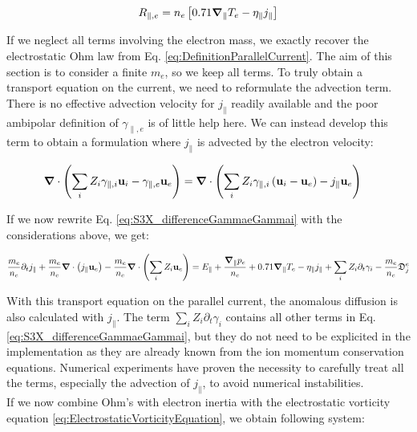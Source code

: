 \begin{align}
	R_{\parallel,e} = n_e\left[0.71\grad_\parallel T_e - \eta_\parallel j_\parallel\right]
\end{align}

If we neglect all terms involving the electron mass, we exactly recover the electrostatic Ohm law from Eq. \ref{eq:DefinitionParallelCurrent}. The aim of this section is to consider a finite $m_e$, so we keep all terms. To truly obtain a transport equation on the current, we need to reformulate the advection term. There is no effective advection velocity for $j_\parallel$ readily available and the poor ambipolar definition of $\gamma_{\parallel,e}$ is of little help here. We can instead develop this term to obtain a formulation where $j_\parallel$ is advected by the electron velocity:

\begin{align}
	\grad\cdot\left(\sum_i Z_i\gamma_{\parallel,i}\mathbf{u}_i - \gamma_{\parallel,e}\mathbf{u}_e\right) &= \grad\cdot\left(\sum_i Z_i\gamma_{\parallel,i}\left(\mathbf{u}_i-\mathbf{u}_e\right) - j_\parallel\mathbf{u}_e\right)
\end{align}

If we now rewrite Eq. \ref{eq:S3X_differenceGammaeGammai} with the considerations above, we get: 

\begin{equation}
	\label{eq:S3X_OhmLawElectronInertia}
	\frac{m_e}{n_e}\partial_t j_\parallel + \frac{m_e}{n_e}\grad\cdot\left(j_\parallel\mathbf{u}_e\right)  - \frac{m_e}{n_e}\grad\cdot\left(\sum_i Z_i\mathbf{u}_e\right) = E_\parallel + \frac{\grad_\parallel p_e}{n_e} + 0.71\grad_\parallel T_e - \eta_\parallel j_\parallel + \sum_i Z_i \partial_t \gamma_i - \frac{m_e}{n_e}\mathfrak{D}_j^e
\end{equation}

With this transport equation on the parallel current, the anomalous diffusion is also calculated with $j_\parallel$. The term $\sum_i Z_i \partial_t \gamma_i$ contains all other terms in Eq. \ref{eq:S3X_differenceGammaeGammai}, but they do not need to be explicited in the implementation as they are already known from the ion momentum conservation equations. Numerical experiments have proven the necessity to carefully treat all the terms, especially the advection of $j_\parallel$, to avoid numerical instabilities. \\

If we now combine Ohm's with electron inertia with the electrostatic vorticity equation \ref{eq:ElectrostaticVorticityEquation}, we obtain following system:

